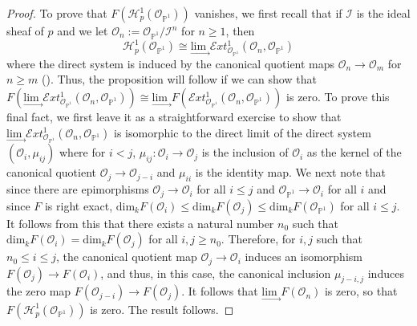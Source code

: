 \documentclass[10pt]{amsart}
\theoremstyle{definition}
\theoremstyle{remark}
\numberwithin{equation}{section}
\begin{document}
\begin{proof}
To prove that $F(\mathcal{H}_{p}^{1}(\mathcal{O}_{\mathbb{P}^{1}}))$ vanishes, we first recall that
if $\mathcal{I}$ is the ideal sheaf of $p$ and we let $\mathcal{O}_{n} := \mathcal{O}_{\mathbb{P}^{1}}/\mathcal{I}^{n}$ for $n \geq 1$, then
$$
\mathcal{H}_{p}^{1}(\mathcal{O}_{\mathbb{P}^{1}}) \cong \underset{\rightarrow}{\mbox{lim }}
\mathcal{E}xt_{\mathcal{O}_{\mathbb{P}^{1}}}^{1}(\mathcal{O}_{n},\mathcal{O}_{\mathbb{P}^{1}})
$$
where the direct system is induced by the canonical quotient maps $\mathcal{O}_{n} \rightarrow \mathcal{O}_{m}$ for $n \geq m$ (\cite[Theorem 2.8]{Hart2}).  Thus, the proposition will follow if we can show that $F(\underset{\rightarrow}{\mbox{lim }}
\mathcal{E}xt_{\mathcal{O}_{\mathbb{P}^{1}}}^{1}(\mathcal{O}_{n},\mathcal{O}_{\mathbb{P}^{1}})) \cong \underset{\rightarrow}{\mbox{lim }}F(
\mathcal{E}xt_{\mathcal{O}_{\mathbb{P}^{1}}}^{1}(\mathcal{O}_{n},\mathcal{O}_{\mathbb{P}^{1}}))$
is zero.  To prove this final fact, we first leave it as a straightforward exercise to show that $\underset{\rightarrow}{\mbox{lim }}
\mathcal{E}xt_{\mathcal{O}_{\mathbb{P}^{1}}}^{1}(\mathcal{O}_{n},\mathcal{O}_{\mathbb{P}^{1}})$ is isomorphic to the direct limit of the direct system $(\mathcal{O}_{i},\mu_{ij})$ where for $i < j$, $\mu_{ij}:\mathcal{O}_{i} \rightarrow \mathcal{O}_{j}$ is the inclusion of $\mathcal{O}_{i}$ as the kernel of the canonical quotient $\mathcal{O}_{j} \rightarrow \mathcal{O}_{j-i}$ and $\mu_{ii}$ is the identity map.  We next note that since there are epimorphisms $\mathcal{O}_{j} \rightarrow \mathcal{O}_{i}$ for all $i \leq j$ and $\mathcal{O}_{\mathbb{P}^{1}} \rightarrow \mathcal{O}_{i}$ for all $i$ and since $F$ is right exact, $\mbox{dim}_{k}F(\mathcal{O}_{i}) \leq \mbox{dim}_{k}F(\mathcal{O}_{j}) \leq \mbox{dim}_{k}F(\mathcal{O}_{\mathbb{P}^{1}})$ for all $i \leq j$.  It follows from this that there exists a natural number $n_{0}$ such that $\mbox{dim}_{k}F(\mathcal{O}_{i})=\mbox{dim}_{k}F(\mathcal{O}_{j})$ for all $i,j \geq n_{0}$.  Therefore, for $i,j$ such that $n_{0} \leq i \leq j$, the canonical quotient map $\mathcal{O}_{j} \rightarrow \mathcal{O}_{i}$ induces an isomorphism $F(\mathcal{O}_{j}) \rightarrow F(\mathcal{O}_{i})$, and thus, in this case, the canonical inclusion $\mu_{j-i,j}$ induces the zero map $F(\mathcal{O}_{j-i}) \rightarrow F(\mathcal{O}_{j})$.  It follows that $\underset{\rightarrow}{\mbox{lim }}F(\mathcal{O}_{n})$ is zero, so that $F(\mathcal{H}_{p}^{1}(\mathcal{O}_{\mathbb{P}^{1}}))$ is zero.  The result follows.
\end{proof}
\end{document}
